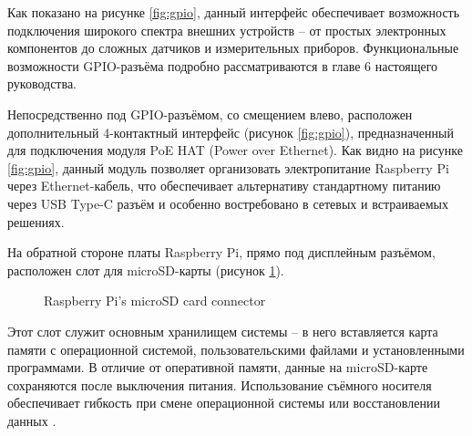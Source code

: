 Как показано на рисунке \ref{fig:gpio}, данный интерфейс обеспечивает возможность подключения широкого спектра внешних устройств -- от простых электронных компонентов  до сложных датчиков и измерительных приборов. Функциональные возможности GPIO-разъёма подробно рассматриваются в главе 6 настоящего руководства.

Непосредственно под GPIO-разъёмом, со смещением влево, расположен дополнительный 4-контактный интерфейс (рисунок \ref{fig:gpio}), предназначенный для подключения модуля PoE HAT (Power over Ethernet). Как видно на рисунке \ref{fig:gpio}, данный модуль позволяет организовать электропитание Raspberry Pi через Ethernet-кабель, что обеспечивает альтернативу стандартному питанию через USB Type-C разъём и особенно востребовано в сетевых и встраиваемых решениях.

На обратной стороне платы Raspberry Pi, прямо под дисплейным разъёмом, расположен слот для microSD-карты (рисунок \ref{fig:microSd}).

\begin{figure}[H]
	\centering
	\caption{Raspberry Pi’s microSD card connector}
	\label{fig:microSd}
\end{figure}

Этот слот служит основным хранилищем системы -- в него вставляется карта памяти с операционной системой, пользовательскими файлами и установленными программами. В отличие от оперативной памяти, данные на microSD-карте сохраняются после выключения питания. Использование съёмного носителя обеспечивает гибкость при смене операционной системы или восстановлении данных \cite{RaspberryPi}.

\newpage
